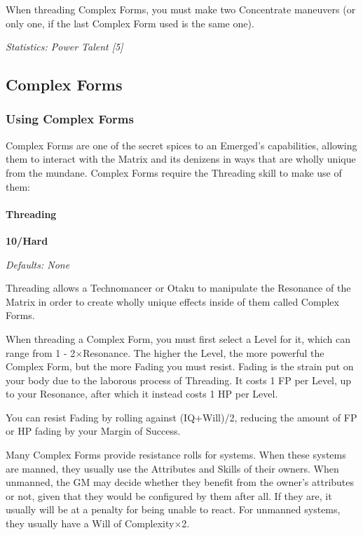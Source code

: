 \begin{multicols*}{3}
	When threading Complex Forms, you must make two Concentrate maneuvers (or only one, if the last Complex Form used is the same one).
	
	\textit{\textcolor{OliveGreen}{Statistics: Power Talent [5]}}
	
	\subsection{Complex Forms}
	
	\subsubsection{Using Complex Forms}
	
	Complex Forms are one of the secret spices to an Emerged's capabilities, allowing them to interact with the Matrix and its denizens in ways that are wholly unique from the mundane. Complex Forms require the Threading skill to make use of them:
	
	\paragraph{Threading}
	\begin{flushright}
		\textbf{10/Hard}
	\end{flushright}
	\textcolor{NavyBlue}{\textit{Defaults: None}}
	
	Threading allows a Technomancer or Otaku to manipulate the Resonance of the Matrix in order to create wholly unique effects inside of them called Complex Forms.
	
	When threading a Complex Form, you must first select a Level for it, which can range from 1 - 2\(\times\)Resonance. The higher the Level, the more powerful the Complex Form, but the more Fading you must resist. Fading is the strain put on your body due to the laborous process of Threading. It costs 1 FP per Level, up to your Resonance, after which it instead costs 1 HP per Level.
	
	You can resist Fading by rolling against (IQ+Will)/2, reducing the amount of FP or HP fading by your Margin of Success.
	
	Many Complex Forms provide resistance rolls for systems. When these systems are manned, they usually use the Attributes and Skills of their owners. When unmanned, the GM may decide whether they benefit from the owner's attributes or not, given that they would be configured by them after all. If they are, it usually will be at a penalty for being unable to react. For unmanned systems, they usually have a Will of Complexity\(\times\)2.
	

\end{multicols*}
